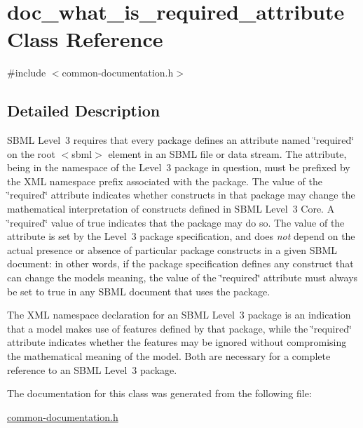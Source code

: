 \hypertarget{classdoc__what__is__required__attribute}{}\section{doc\+\_\+what\+\_\+is\+\_\+required\+\_\+attribute Class Reference}
\label{classdoc__what__is__required__attribute}


{\ttfamily \#include $<$common-\/documentation.\+h$>$}



\subsection{Detailed Description}
\begin{DoxyParagraph}{}
S\+B\+ML Level~3 requires that every package defines an attribute named \char`\"{}required\char`\"{} on the root {\ttfamily $<$sbml$>$} element in an S\+B\+ML file or data stream. The attribute, being in the namespace of the Level~3 package in question, must be prefixed by the X\+ML namespace prefix associated with the package. The value of the \char`\"{}required\char`\"{} attribute indicates whether constructs in that package may change the mathematical interpretation of constructs defined in S\+B\+ML Level~3 Core. A \char`\"{}required\char`\"{} value of {\ttfamily true} indicates that the package may do so. The value of the attribute is set by the Level~3 package specification, and does {\itshape not} depend on the actual presence or absence of particular package constructs in a given S\+B\+ML document\+: in other words, if the package specification defines any construct that can change the model\textquotesingle{}s meaning, the value of the \char`\"{}required\char`\"{} attribute must always be set to {\ttfamily true} in any S\+B\+ML document that uses the package.
\end{DoxyParagraph}
The X\+ML namespace declaration for an S\+B\+ML Level~3 package is an indication that a model makes use of features defined by that package, while the \char`\"{}required\char`\"{} attribute indicates whether the features may be ignored without compromising the mathematical meaning of the model. Both are necessary for a complete reference to an S\+B\+ML Level~3 package. 

The documentation for this class was generated from the following file\+:\begin{DoxyCompactItemize}
\item 
\hyperlink{common-documentation_8h}{common-\/documentation.\+h}\end{DoxyCompactItemize}
